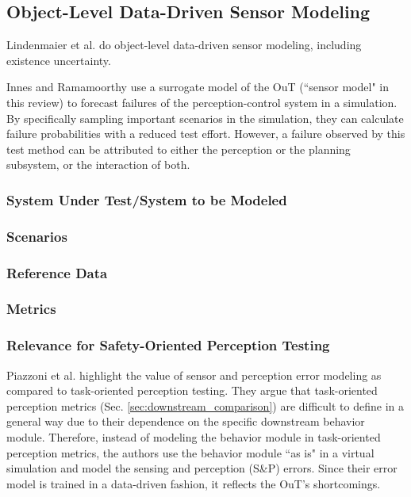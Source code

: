 \documentclass[conference]{IEEEtran}
\begin{document}
\subsection{Object-Level Data-Driven Sensor Modeling}
\label{sec:sensor_modeling}

Lindenmaier et al. \cite{Lindenmaier2023sensor} do object-level data-driven sensor modeling, including existence uncertainty.

Innes and Ramamoorthy \cite{Innes2022testing} use a surrogate model of the OuT (``sensor model" in this review) to forecast failures of the perception-control system in a simulation. 
By specifically sampling important scenarios in the simulation, they can calculate failure probabilities with a reduced test effort. 
However, a failure observed by this test method can be attributed to either the perception or the planning subsystem, or the interaction of both. 


\subsubsection{System Under Test/System to be Modeled}
\subsubsection{Scenarios}


\subsubsection{Reference Data}
\subsubsection{Metrics}

\subsubsection{Relevance for Safety-Oriented Perception Testing}


\mbox{Piazzoni} et al. \cite{Piazzoni2023simulation} highlight the value of sensor and perception error modeling as compared to task-oriented perception testing. 
They argue that task-oriented perception metrics (Sec. \ref{sec:downstream_comparison}) are difficult to define in a general way due to their dependence on the specific downstream behavior module. 
Therefore, instead of modeling the behavior module in task-oriented perception metrics, the authors use the behavior module ``as is" in a virtual simulation and model the sensing and perception (S\&P) errors. 
Since their error model is trained in a data-driven fashion, it reflects the OuT's shortcomings. 
\end{document}
